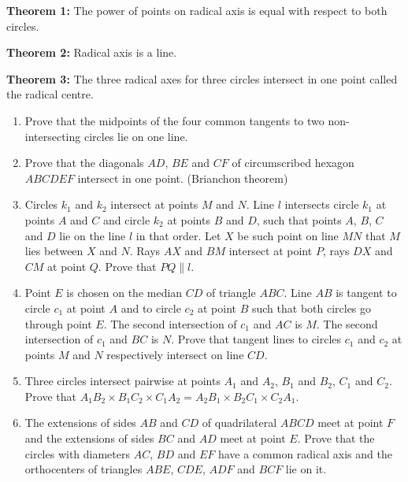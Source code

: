 \documentclass{article}
\begin{document}
\textbf{Theorem 1: }
The power of points on radical axis is equal with respect to both circles.

\textbf{Theorem 2: }
Radical axis is a line.

\textbf{Theorem 3: }
The three radical axes for three circles intersect in one point called the radical centre. 

\begin{enumerate}

\item %
Prove that the midpoints of the four common tangents to two non-intersecting circles lie on one line.

\item %
Prove that the diagonals $AD$, $BE$ and $CF$ of circumscribed hexagon $ABCDEF$ intersect in one point. (Brianchon theorem)

\item %
Circles $k_1$ and $k_2$ intersect at points  $M$ and $N$. Line $l$ intersects circle $k_1$ at points $A$ and $C$ and circle $k_2$ at points $B$ and $D$, such that points $A$,  $B$, $C$ and $D$ lie on the line $l$ in that order. Let $X$ be such point on line $MN$ that $M$ lies between $X$ and $N$. Rays $AX$ and $BM$ intersect at point $P$, rays $DX$ and $CM$ at point $Q$. Prove that $PQ \parallel l$.

\item %
Point $E$ is chosen on the median $CD$ of triangle $ABC$. Line $AB$ is tangent to circle $c_1$ at point $A$ and to circle $c_2$ at point $B$ such that both circles go through point $E$. The second intersection of $c_1$ and  $AC$ is $M$. The second intersection of $c_1$ and $BC$ is $N$. Prove that tangent lines to circles $c_1$ and $c_2$ at points $M$ and $N$ respectively intersect on line $CD$.


\item %
Three circles intersect pairwise at points $A_1$ and $A_2$, $B_1$ and $B_2$, $C_1$ and $C_2$. Prove that $A_1B_2 \times B_1C_2 \times C_1A_2 = A_2B_1 \times B_2C_1 \times C_2A_1$.


\item %
The extensions of sides $AB$ and $CD$ of quadrilateral $ABCD$ meet at point $F$ and
the extensions of sides $BC$ and $AD$ meet at point $E$. Prove that the circles with diameters
$AC$, $BD$ and $EF$ have a common radical axis and the orthocenters of triangles $ABE$, $CDE$,
$ADF$ and $BCF$ lie on it.

\end{enumerate}
\end{document}
